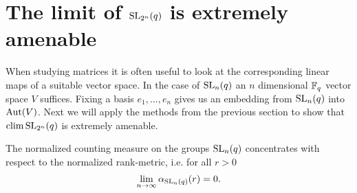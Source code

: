 \section{The limit of $\operatorname{SL}_{2^n}(q)$ is extremely amenable}

When studying matrices it is often useful to look at the corresponding linear maps of a suitable vector space. 
In the case of $\operatorname{SL}_n(q)$ an $n$ dimensional $\mathbb{F}_q$ vector space $V$ suffices. Fixing a basis $e_1,\dots,e_n$ gives us an embedding from $\operatorname{SL}_n(q)$ into $\operatorname{Aut}(V)$. Next we will apply the methods from the previous section to show that $\operatorname{clim} \operatorname{SL}_{2^n}(q)$ is extremely amenable.
\begin{theorem}\label{thm:SLConcentrates}
The normalized counting measure on the groups $\operatorname{SL}_{n}(q)$ concentrates with respect to the normalized rank-metric, i.e. for all $r>0$
\[\lim_{n\to\infty} \alpha_{\operatorname{SL}_{n}(q)}(r)=0 .\]
\end{theorem}
